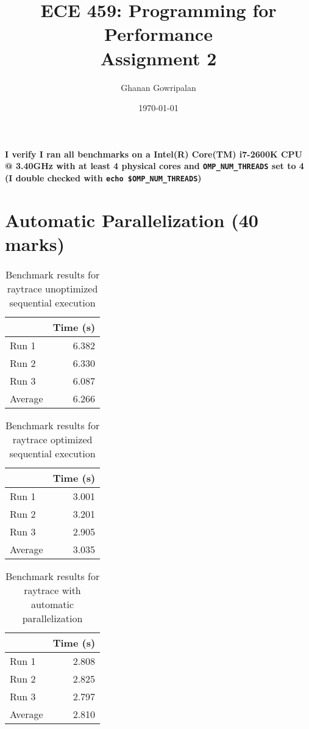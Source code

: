 \documentclass[12pt]{article}
\title{ECE 459: Programming for Performance\\Assignment 2}
\author{Ghanan Gowripalan}
\date{\today}
\begin{document}
\maketitle

{\bf I verify I ran all benchmarks on a Intel(R) Core(TM) i7-2600K CPU @ 3.40GHz with at least 4 physical cores and
{\tt OMP\_NUM\_THREADS} set to 4 (I double checked with
{\tt echo \$OMP\_NUM\_THREADS})}

\section*{Automatic Parallelization (40 marks)}

\begin{table}[H]
  \centering
  \begin{tabular}{lr}
    & {\bf Time (s)} \\
    \hline
    Run 1 & 6.382 \\
    Run 2 & 6.330 \\
    Run 3 & 6.087 \\
    \hline
    Average & 6.266 \\
  \end{tabular}
  \caption{Benchmark results for raytrace unoptimized sequential execution}
  \label{tbl-raytrace-unopt-sequential}
\end{table}

\begin{table}[H]
  \centering
  \begin{tabular}{lr}
    & {\bf Time (s)} \\
    \hline
    Run 1 & 3.001 \\
    Run 2 & 3.201 \\
    Run 3 & 2.905 \\
    \hline
    Average & 3.035 \\
  \end{tabular}
  \caption{Benchmark results for raytrace optimized sequential execution}
  \label{tbl-raytrace-opt-sequential}
\end{table}

\begin{table}[H]
  \centering
  \begin{tabular}{lr}
    & {\bf Time (s)} \\
    \hline
    Run 1 & 2.808 \\
    Run 2 & 2.825 \\
    Run 3 & 2.797 \\
    \hline
    Average & 2.810 \\
  \end{tabular}
  \caption{Benchmark results for raytrace with automatic parallelization}
  \label{tbl-raytrace-automatic}
\end{table}
\end{document}
